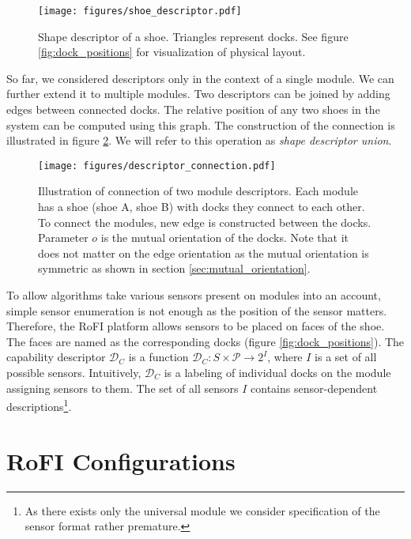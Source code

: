 \begin{figure}[t]
    \centering
    \texttt{[image: figures/shoe\_descriptor.pdf]}
    \caption{Shape descriptor of a shoe. Triangles represent docks. See figure
    \ref{fig:dock_positions} for visualization of physical layout.}
    \label{fig:shoe_descriptor}
\end{figure}

So far, we considered descriptors only in the context of a single module. We can
further extend it to multiple modules. Two descriptors can be joined by adding
edges between connected docks. The relative position of any two shoes in the
system can be computed using this graph. The construction of the connection is
illustrated in figure \ref{fig:connection_descriptor}. We will refer to this
operation as \emph{shape descriptor union}.

\begin{figure}[t]
    \centering
    \texttt{[image: figures/descriptor\_connection.pdf]}
    \caption{Illustration of connection of two module descriptors. Each module
    has a shoe (shoe A, shoe B) with docks they connect to each other. To
    connect the modules, new edge is constructed between the docks. Parameter
    $o$ is the mutual orientation of the docks. Note that it does not matter on
    the edge orientation as the mutual orientation is symmetric as shown in
    section \ref{sec:mutual_orientation}. }
    \label{fig:connection_descriptor}
\end{figure}

To allow algorithms take various sensors present on modules into an account,
simple sensor enumeration is not enough as the position of the sensor matters.
Therefore, the RoFI platform allows sensors to be placed on faces of the shoe.
The faces are named as the corresponding docks (figure
\ref{fig:dock_positions}). The capability descriptor $\mathcal{D}_C$ is a
function $\mathcal{D}_C: S\times\mathcal{P} \rightarrow 2^{I}$, where $I$ is a
set of all possible sensors. Intuitively, $\mathcal{D}_C$ is a labeling of
individual docks on the module assigning sensors to them. The set of all sensors
$I$ contains sensor-dependent descriptions\footnote{As there exists only the
universal module we consider specification of the sensor format rather
premature.}.

\section{RoFI Configurations} \label{sec:configuration}

